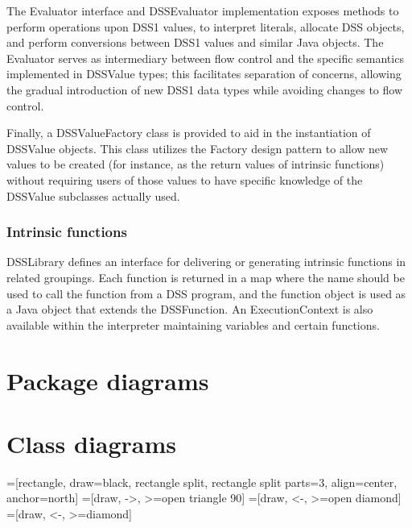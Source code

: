 \documentclass[12pt,letterpaper]{article}
\begin{document}
{The Evaluator interface and DSSEvaluator implementation exposes methods to perform operations upon DSS1 values, to interpret literals, allocate DSS objects, and perform conversions between DSS1 values and similar Java objects. The Evaluator serves as intermediary between flow control and the specific semantics implemented in DSSValue types; this facilitates separation of concerns, allowing the gradual introduction of new DSS1 data types while avoiding changes to  flow control.

Finally, a DSSValueFactory class is provided to aid in the instantiation of DSSValue objects. This class utilizes the Factory design pattern to allow new values to be created (for instance, as the return values of intrinsic functions) without requiring users of those values to have specific knowledge of the DSSValue subclasses actually used.

\subsubsection{Intrinsic functions}

DSSLibrary defines an interface for delivering or generating intrinsic functions in related groupings. Each function is returned in a map where the name should be used to call the function from a DSS program, and the function object is used as a Java object that extends the DSSFunction. An ExecutionContext is also available within the interpreter maintaining variables and certain functions.


\newpage 
\section{Package diagrams}

\newpage 
\section{Class diagrams}

=[rectangle, 
                   draw=black, 
                   rectangle split, 
                   rectangle split parts=3,
                   align=center,
                   anchor=north]
=[draw, ->, >=open triangle 90]
=[draw, <-, >=open diamond]
=[draw, <-, >=diamond]

}
\end{document}

